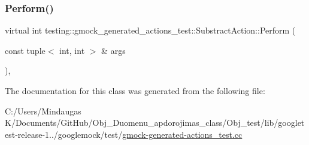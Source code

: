 \subsubsection{\texorpdfstring{Perform()}{Perform()}}
{\footnotesize\ttfamily virtual int testing\+::gmock\+\_\+generated\+\_\+actions\+\_\+test\+::\+Substract\+Action\+::\+Perform (\begin{DoxyParamCaption}\item[{const tuple$<$ int, int $>$ \&}]{args }\end{DoxyParamCaption})\hspace{0.3cm}{\ttfamily [inline]}, {\ttfamily [virtual]}}



The documentation for this class was generated from the following file\+:\begin{DoxyCompactItemize}
\item 
C\+:/\+Users/\+Mindaugas K/\+Documents/\+Git\+Hub/\+Obj\+\_\+\+Duomenu\+\_\+apdorojimas\+\_\+class/\+Obj\+\_\+test/lib/googletest-\/release-\/1../googlemock/test/\mbox{\hyperlink{_obj__test_2lib_2googletest-release-1_88_81_2googlemock_2test_2gmock-generated-actions__test_8cc}{gmock-\/generated-\/actions\+\_\+test.\+cc}}\end{DoxyCompactItemize}
